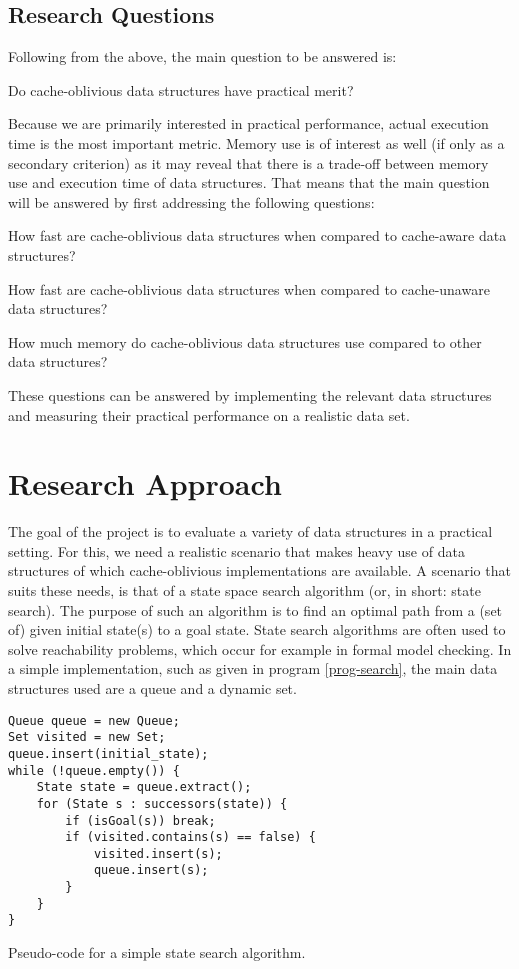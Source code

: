 \documentclass{acm_proc_article-sp}
\begin{document}
\subsection{Research Questions}
Following from the above, the main question to be answered is:
\begin{list}{}{}
\item Do cache-oblivious data structures have practical merit?
\end{list}

Because we are primarily interested in practical performance, actual execution time is the most important metric. Memory use is of interest as well (if only as a secondary criterion) as it may reveal that there is a trade-off between memory use and execution time of data structures. That means that the main question will be answered by first addressing the following questions:
\begin{list}{.}{}
\item How fast are cache-oblivious data structures when compared to cache-aware data structures?
\item How fast are cache-oblivious data structures when compared to cache-unaware data structures?
\item How much memory do cache-oblivious data structures use compared to other data structures?
\end{list}
These questions can be answered by implementing the relevant data structures and measuring their practical performance on a realistic data set.

\section{Research Approach}
The goal of the project is to evaluate a variety of data structures in a practical setting. For this, we need a realistic scenario that makes heavy use of data structures of which cache-oblivious implementations are available. A scenario that suits these needs, is that of a state space search algorithm (or, in short: state search). The purpose of such an algorithm is to find an optimal path from a (set of) given initial state(s) to a goal state. State search algorithms are often used to solve reachability problems, which occur for example in formal model checking. In a simple implementation, such as given in program \ref{prog-search}, the main data structures used are a queue and a dynamic set.

\begin{program}
\begin{verbatim}
Queue queue = new Queue;
Set visited = new Set;
queue.insert(initial_state);
while (!queue.empty()) {
    State state = queue.extract();
    for (State s : successors(state)) {
        if (isGoal(s)) break;
        if (visited.contains(s) == false) {
            visited.insert(s);
            queue.insert(s);
        }
    }
}
\end{verbatim}
\caption{Pseudo-code for a simple state search algorithm.}
\label{prog-search}
\end{program}
\end{document}
